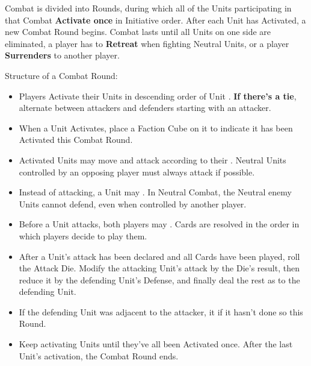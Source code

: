 \begin{multicols*}{2}

Combat is divided into Rounds, during which all of the Units participating in that Combat \textbf{Activate once} in Initiative order.
After each Unit has Activated, a new Combat Round begins.
Combat lasts until all Units on one side are eliminated, a player has to \textbf{Retreat} when fighting Neutral Units, or a player \textbf{Surrenders} to another player.

Structure of a Combat Round:
\begin{itemize}
  \item Players Activate their Units in descending order of Unit . \textbf{If there's a tie}, alternate between attackers and defenders starting with an attacker.
  \item When a Unit Activates, place a Faction Cube on it to indicate it has been Activated this Combat Round.
  \item Activated Units may move and attack according to their . Neutral Units controlled by an opposing player must always attack if possible.
  \item Instead of attacking, a Unit may .
  In Neutral Combat, the Neutral enemy Units cannot defend, even when controlled by another player.
  \item Before a Unit attacks, both players may . Cards are resolved in the order in which players decide to play them.
  \item After a Unit's attack has been declared and all Cards have been played, roll the Attack Die.
    Modify the attacking Unit's attack by the Die's result, then reduce it by the defending Unit's Defense, and finally deal the rest as  to the defending Unit.
  \item If the defending Unit was adjacent to the attacker, it  if it hasn't done so this Round.
  \item Keep activating Units until they've all been Activated once.
After the last Unit's activation, the Combat Round ends.
\end{itemize}
\vspace*{\fill}


\end{multicols*}

